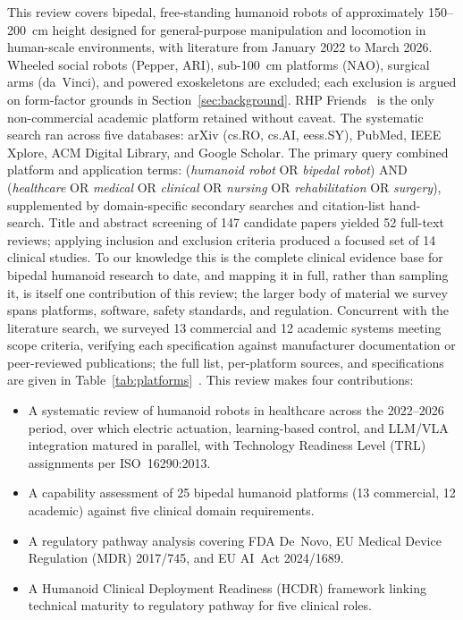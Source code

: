 This review covers bipedal, free-standing humanoid robots of approximately
150--200~cm height designed for general-purpose manipulation and locomotion in
human-scale environments, with literature from January 2022 to March 2026.
Wheeled social robots (Pepper, ARI), sub-100~cm platforms (NAO), surgical arms
(da~Vinci), and powered exoskeletons are excluded; each exclusion is argued on
form-factor grounds in Section~\ref{sec:background}. RHP
Friends~\cite{benallegue2025rhp} is the only non-commercial academic platform
retained without caveat. The systematic search ran across five databases: arXiv
(cs.RO, cs.AI, eess.SY), PubMed, IEEE Xplore, ACM Digital Library, and Google
Scholar. The primary query combined platform and application terms:
(\emph{humanoid robot} OR \emph{bipedal robot}) AND (\emph{healthcare} OR
\emph{medical} OR \emph{clinical} OR \emph{nursing} OR \emph{rehabilitation} OR
\emph{surgery}), supplemented by domain-specific secondary searches and
citation-list hand-search. Title and abstract screening of 147 candidate papers
yielded 52 full-text reviews; applying inclusion and exclusion criteria produced
a focused set of 14 clinical studies. To our knowledge this is the complete
clinical evidence base for bipedal humanoid research to date, and mapping it in
full, rather than sampling it, is itself one contribution of this review; the
larger body of material we survey spans platforms, software, safety standards,
and regulation.
Concurrent with the literature search, we surveyed 13
commercial and 12 academic systems meeting scope criteria, verifying each
specification against manufacturer documentation or peer-reviewed publications;
the full list, per-platform sources, and specifications are given in
Table~\ref{tab:platforms}~\cite{figureai2024unveils,unitree2024g1,bostondynamics2024atlas,apptronik2023apollo,sanctuaryai2023phoenix,dafarra2024icub3}. This review makes four contributions:


\begin{itemize}
\item A systematic review of humanoid robots in healthcare across the 2022--2026
  period, over which electric actuation, learning-based control, and LLM/VLA
  integration matured in parallel, with Technology Readiness Level (TRL)
  assignments per ISO~16290:2013.
\item A capability assessment of 25 bipedal humanoid platforms (13 commercial,
  12 academic) against five clinical domain requirements.
\item A regulatory pathway analysis covering FDA De~Novo, EU Medical Device
  Regulation (MDR) 2017/745, and EU AI~Act 2024/1689.
\item A Humanoid Clinical Deployment Readiness (HCDR) framework linking technical
  maturity to regulatory pathway for five clinical roles.
\end{itemize}

